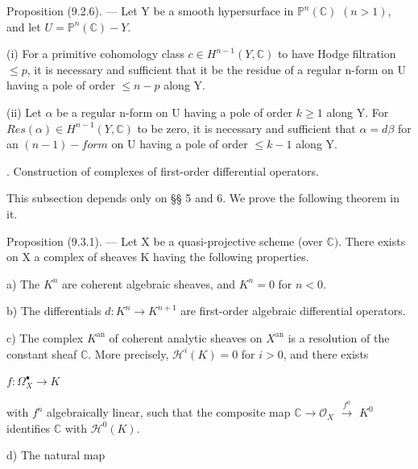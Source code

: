 \documentclass[11pt,twoside]{article}
\newcommand{\DFormula}[1]{%
  \par\smallskip\noindent\hspace*{0pt}\(\displaystyle #1\)\par\smallskip
}
\begin{document}
Proposition (9.2.6). — Let Y be a smooth hypersurface in \(ℙ^{n}(\mathbb{C})\) \((n>1)\), and let \(U=ℙ^{n}(\mathbb{C})−Y\).\par
\par\medskip
(i) For a primitive cohomology class \(c\in H^{n−1}(Y,\mathbb{C})\) to have Hodge filtration \(\leq p\), it is necessary and sufficient that it be the residue of a regular n-form on U having a pole of order \(\leq n−p\) along Y.\par
\par\medskip
(ii) Let \(\alpha \) be a regular n-form on U having a pole of order \(k\geq 1\) along Y. For \(Res(\alpha )\in H^{n−1}(Y,\mathbb{C})\) to be zero, it is necessary and sufficient that \(\alpha =d\beta \) for an \((n−1)-form\) on U having a pole of order \(\leq k−1\) along Y.\par
\par{}. Construction of complexes of first-order differential operators.\par
\par\medskip
This subsection depends only on §§ 5 and 6. We prove the following theorem in it.\par
\par\medskip
Proposition (9.3.1). — Let X be a quasi-projective scheme (over \(\mathbb{C})\). There exists on X a complex of sheaves K having the following properties.\par
\par\medskip
a) The \(K^{n}\) are coherent algebraic sheaves, and \(K^{n}=0\) for \(n<0\).\par
\par\medskip
b) The differentials \(d:K^{n}\to K^{n+1}\) are first-order algebraic differential operators.\par
\par\medskip
c) The complex \(K^{\mathrm{an}}\) of coherent analytic sheaves on \(X^{\mathrm{an}}\) is a resolution of the constant sheaf \(\mathbb{C}\). More precisely, \(\mathcal{H}^{i}(K)=0\) for \(i>0\), and there exists\par
\par\medskip
\DFormula{f:\Omega _{X}^{\bullet }\to K}
\par\medskip
with \(f^{n}\) algebraically linear, such that the composite map \(\mathbb{C}\to \mathcal{O}_{X}\) \(\xrightarrow{f^{0}}\) \(K^{0}\) identifies \(\mathbb{C}\) with \(\mathcal{H}^{0}(K)\).\par
\par\medskip
d) The natural map\par
\end{document}
